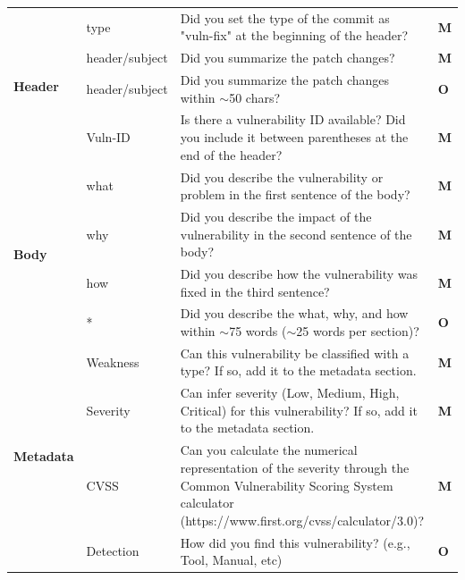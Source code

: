 \begin{table}
    \footnotesize

    \begin{tabular}{ | p{1.75cm} | p{1.75cm} | p{11.75cm} | p{0.25cm} | } 
    \hline
        \multirow{4}{*}{\textbf{Header}} & type & Did you set the type of the commit as "vuln-fix" at the beginning of the header? & \textbf{M} \\\cline{2-4}
                                & header/subject & Did you summarize the patch changes? & \textbf{M} \\\cline{2-4}
                                & header/subject & Did you summarize the patch changes within $\sim$50 chars?	 & \textbf{O} \\\cline{2-4}
                                & Vuln-ID & Is there a vulnerability ID available? Did you include it between parentheses at the end of the header? & \textbf{M} \\
    \hline\hline
        \multirow{4}{*}{\textbf{Body}} & what & Did you describe the vulnerability or problem in the first sentence of the body?	 & \textbf{M} \\\cline{2-4}
                                & why & Did you describe the impact of the vulnerability in the second sentence of the body?	 & \textbf{M} \\\cline{2-4}
                                & how & Did you describe how the vulnerability was fixed in the third sentence?		 & \textbf{M} \\\cline{2-4}
                                & * & Did you describe the what, why, and how within $\sim$75 words ($\sim$25 words per section)? & \textbf{O} \\
    \hline\hline
        \multirow{6}{*}{\textbf{Metadata}} & Weakness & Can this vulnerability be classified with a type? If so, add it to the metadata section. & \textbf{M} \\\cline{2-4}
                                & Severity & Can infer severity (Low, Medium, High, Critical) for this vulnerability? If so, add it to the metadata section.	 & \textbf{M} \\\cline{2-4}
                                & CVSS & Can you calculate the numerical representation of the severity through the Common Vulnerability Scoring System calculator (https://www.first.org/cvss/calculator/3.0)?			 & \textbf{M} \\\cline{2-4}
                                & Detection & How did you find this vulnerability? (e.g., Tool, Manual, etc) & \textbf{O} \\\cline{2-4}

\end{tabular}
\end{table}
